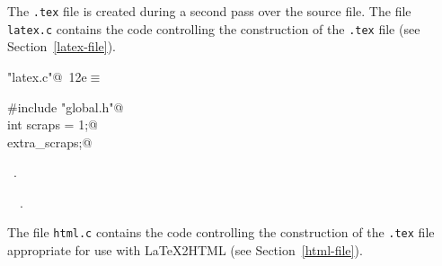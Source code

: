 \documentclass[a4paper]{report}
\begin{document}
The \verb|.tex| file is created during a second pass over the source
file. The file \verb|latex.c| contains the code controlling the
construction of the \verb|.tex| file
(see Section~\ref{latex-file}).
\begin{flushleft} \small
\begin{minipage}{\linewidth}\label{scrap7}\raggedright\small
{} \verb@"latex.c"@\nobreak\ {\footnotesize {12e}}$\equiv$
\vspace{-1ex}
\begin{list}{}{} \item
\mbox{}\verb@#include "global.h"@\\
\mbox{}\verb@static int scraps = 1;@\\
\mbox{}\verb@int extra_scraps;@\\
\mbox{}\verb@@{\NWsep}
\end{list}
\vspace{-1.5ex}
\footnotesize
\begin{list}{}{\setlength{\itemsep}{-\parsep}\setlength{\itemindent}{-\leftmargin}}
\item \NWtxtFileDefBy\ .
\item \NWtxtIdentsUsed\nobreak\  \verb@scraps@\nobreak\ .
\item{}
\end{list}
\end{minipage}\vspace{4ex}
\end{flushleft}
The file \verb|html.c| contains the code controlling the
construction of the \verb|.tex| file appropriate for use with {\LaTeX}2HTML
(see Section~\ref{html-file}).
\end{document}
